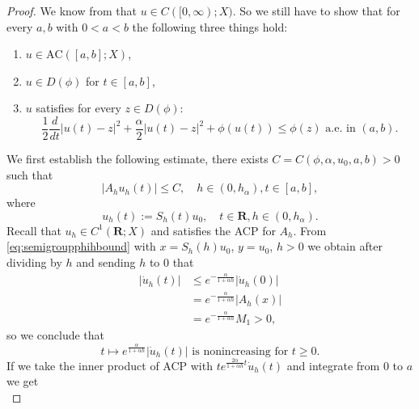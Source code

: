 \documentclass[a4paper,11pt, leqno]{scrreprt} %
\renewcommand{\leq}{\leqslant}
\renewcommand{\leq}{\leqslant}
\renewcommand{\geq}{\geqslant}
\newcommand{\R}{\mathbf R}
\theoremstyle{change}
\theoremstyle{nonumberplain}
\newtheorem{proof}{Proof}
\begin{document}
\begin{proof}
  We know from  that $u \in C([0, \infty);
  X)$. So we still have to show that for every $a, b$ with $0 < a < b$
  the following three things hold:
  \begin{enumerate}
  \item\label{item:existenceproof1} $u \in \text{AC}([a,b]; X)$,
  \item\label{item:existenceproof2} $u \in D(\phi)$ for $t \in [a,b]$,
  \item\label{item:existenceproof3} $u$ satisfies for every $z \in D(\phi)$:
    \begin{equation}
      \label{eq:evicutoff}
      \frac12 \frac{d}{dt} |u(t) - z|^2 + \frac\alpha2 |u(t) - z|^2 +
      \phi(u(t)) \leq \phi(z) \text{ a.e.\ in $(a,b)$.}
    \end{equation}
  \end{enumerate}
  We first establish the following estimate, there exists $C = C(\phi,
  \alpha, u_0, a, b) > 0$ such that
  \begin{equation}
    \label{eq:ahboundexistence}
    |A_h u_h(t)| \leq C, \quad h \in (0, h_\alpha), t \in [a,b],
  \end{equation}
  where
  \begin{equation}
    \label{eq:shdefexistence}
    u_h(t) := S_h(t) u_0, \quad t \in \R, h \in (0, h_\alpha).
  \end{equation}
  Recall that $u_h \in C^1(\R; X)$ and satisfies the ACP for
  $A_h$. From \eqref{eq:semigroupphihbound} with $x = S_h(h) u_0$, $y
  = u_0$, $h > 0$ we obtain after dividing by $h$ and sending $h$ to
  $0$ that
  \begin{equation*}
    \begin{split}
      |\dot u_h(t)| &\leq e^{-\frac\alpha{1 + \alpha h}} |\dot
      u_h(0)|\\
      &= e^{-\frac\alpha{1 + \alpha h}} |A_h(x)|\\
      &= e^{-\frac\alpha{1 + \alpha h}} M_1 > 0,
    \end{split}
  \end{equation*}
  so we conclude that
  \begin{equation}
    \label{eq:existencenoninc}
    t \mapsto e^{\frac\alpha{1 + \alpha h}} |\dot u_h(t)| \text{ is
      nonincreasing for $t \geq 0$.}
  \end{equation}
  If we take the inner product of ACP with $t e^{\frac{2\alpha}{1 +
      \alpha h}t} \dot u_h(t)$ and integrate from $0$ to $a$ we get
  \begin{equation*}

\end{equation*}
\end{proof}
\end{document}
